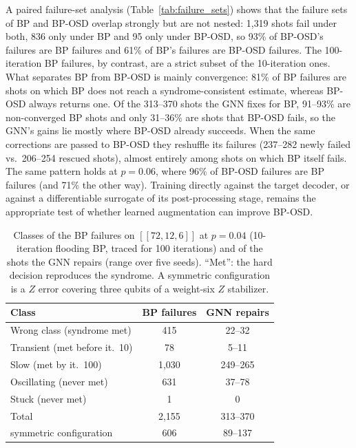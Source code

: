 \documentclass[a4paper,twocolumn,11pt,nopdfoutputerror]{quantumarticle}
\newcommand{\code}[3]{\ensuremath{[\![#1,#2,#3]\!]}}
\begin{document}
A paired failure-set analysis (Table~\ref{tab:failure_sets}) shows that
the failure sets of BP and BP-OSD overlap strongly but are not nested:
1{,}319 shots fail under both, 836 only under BP and 95 only under
BP-OSD, so 93\% of BP-OSD's failures are BP failures and
61\% of BP's failures are BP-OSD failures. The 100-iteration BP
failures, by contrast, are a strict subset of the 10-iteration ones.
What separates BP from BP-OSD is mainly
convergence: 81\% of BP failures are shots on which BP does not reach a
syndrome-consistent estimate, whereas BP-OSD always returns one. Of the
313--370 shots the GNN fixes for BP, 91--93\% are non-converged BP shots
and only 31--36\% are shots that BP-OSD fails, so the GNN's gains lie
mostly where BP-OSD already succeeds. When the same corrections are
passed to BP-OSD they reshuffle its failures (237--282 newly failed vs.\
206--254 rescued shots), almost entirely among shots on which BP itself
fails. The same pattern holds at $p=0.06$, where 96\% of BP-OSD failures
are BP failures (and 71\% the other way). Training directly against
the target decoder, or against a differentiable surrogate of its
post-processing stage, remains the appropriate test of whether learned
augmentation can improve BP-OSD.

\begin{table}[t]
\centering
\caption{Classes of the BP failures on $\code{72}{12}{6}$ at $p=0.04$
         (10-iteration flooding BP, traced for 100 iterations) and of the
         shots the GNN repairs (range over five seeds). ``Met'': the hard
         decision reproduces the syndrome. A symmetric
         configuration is a $Z$ error covering three qubits of a
         weight-six $Z$ stabilizer.}
\label{tab:mechanism}
\footnotesize
\setlength{\tabcolsep}{3pt}
\begin{tabular}{@{}lcc@{}}
\toprule
Class & BP failures & GNN repairs \\
\midrule
Wrong class (syndrome met) & 415 & 22--32 \\
Transient (met before it.~10) & 78 & 5--11 \\
Slow (met by it.~100) & 1{,}030 & 249--265 \\
Oscillating (never met) & 631 & 37--78 \\
Stuck (never met) & 1 & 0 \\
\midrule
Total & 2{,}155 & 313--370 \\
\quad symmetric configuration & 606 & 89--137 \\
\bottomrule
\end{tabular}
\end{table}
\end{document}
